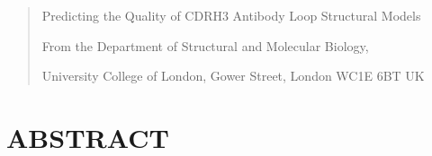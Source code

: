 \documentclass[
]{article}
\author{}
\date{}
\begin{document}
\begin{quote}
Predicting the Quality of CDRH3 Antibody Loop Structural Models

From the Department of Structural and Molecular Biology,

University College of London, Gower Street, London WC1E 6BT UK
\end{quote}

\hypertarget{abstract}{%
\section{ABSTRACT}\label{abstract}}

\hypertarget{therapeutic-antibodies-have-shown-an-unprecedented-pace-of-development-and-have-brought-new-hope-for-the-treatment-of-numerous-diseases.-the-bioinformatic-tools-for-modelling-antibody-structures-have-become-invaluable-for-antibody-engineering-and-the-development-of-therapeutic-antibodies.-the-antigen-binding-site-consists-of-six-hypervariable-loops-also-known-as-the-complementary-determining-regions-cdr-all-of-which-can-be-modelled-with-adequate-accuracy-except-for-one.-it-remains-markedly-difficult-to-model-the-third-cdr-loop-of-the-antibody-heavy-chain.-the-cdrh3-differs-in-length-has-far-greater-sequence-variability-and-has-such-a-great-structural-diversity-that-modelling-it-is-considerably-harder.}{%
}
\end{document}
